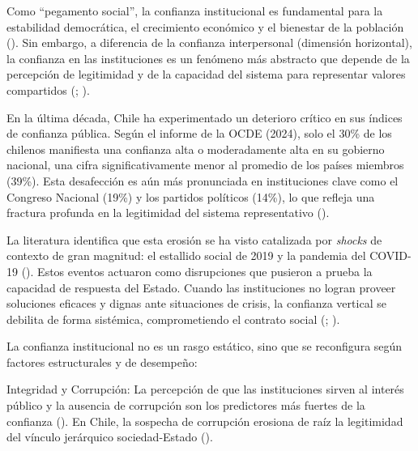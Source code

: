 \documentclass[
  spanish,
  a4paper,
  oneside]{scrbook}
\begin{document}
Como ``pegamento social'', la confianza institucional es fundamental
para la estabilidad democrática, el crecimiento económico y el bienestar
de la población (). Sin
embargo, a diferencia de la confianza interpersonal (dimensión
horizontal), la confianza en las instituciones es un fenómeno más
abstracto que depende de la percepción de legitimidad y de la capacidad
del sistema para representar valores compartidos
(; ).

En la última década, Chile ha experimentado un deterioro crítico en sus
índices de confianza pública. Según el informe de la OCDE (2024), solo
el 30\% de los chilenos manifiesta una confianza alta o moderadamente
alta en su gobierno nacional, una cifra significativamente menor al
promedio de los países miembros (39\%). Esta desafección es aún más
pronunciada en instituciones clave como el Congreso Nacional (19\%) y
los partidos políticos (14\%), lo que refleja una fractura profunda en
la legitimidad del sistema representativo
().

La literatura identifica que esta erosión se ha visto catalizada por
\emph{shocks} de contexto de gran magnitud: el estallido social de 2019
y la pandemia del COVID-19
(). Estos eventos actuaron como disrupciones
que pusieron a prueba la capacidad de respuesta del Estado. Cuando las
instituciones no logran proveer soluciones eficaces y dignas ante
situaciones de crisis, la confianza vertical se debilita de forma
sistémica, comprometiendo el contrato social
(;
).

La confianza institucional no es un rasgo estático, sino que se
reconfigura según factores estructurales y de desempeño:

Integridad y Corrupción: La percepción de que las instituciones sirven
al interés público y la ausencia de corrupción son los predictores más
fuertes de la confianza (). En Chile, la sospecha
de corrupción erosiona de raíz la legitimidad del vínculo jerárquico
sociedad-Estado
().
\end{document}

